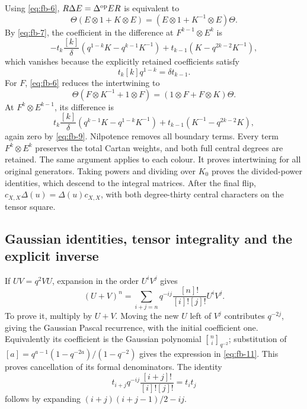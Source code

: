 Using \eqref{eq:fb-6}, \(R\Delta E=\Delta^{\rm op}E R\) is equivalent to
\begin{equation}\tag{FB8}\label{eq:fb-8}
\Theta(E\otimes1+K\otimes E)
 =(E\otimes1+K^{-1}\otimes E)\Theta.
\end{equation}
By \eqref{eq:fb-7}, the coefficient in the difference at \(F^{k-1}\otimes E^k\) is
\[
 -t_k\frac{[k]}{\delta}(q^{1-k}K-q^{k-1}K^{-1})
 +t_{k-1}(K-q^{2k-2}K^{-1}),
\]
which vanishes because the explicitly retained coefficients satisfy
\begin{equation}\tag{FB9}\label{eq:fb-9}
t_k[k]q^{1-k}=\delta t_{k-1}.
\end{equation}
For \(F\), \eqref{eq:fb-6} reduces the intertwining to
\begin{equation}\tag{FB10}\label{eq:fb-10}
\Theta(F\otimes K^{-1}+1\otimes F)
 =(1\otimes F+F\otimes K)\Theta.
\end{equation}
At \(F^k\otimes E^{k-1}\), its difference is
\[
 t_k\frac{[k]}{\delta}(q^{k-1}K-q^{1-k}K^{-1})
 +t_{k-1}(K^{-1}-q^{2k-2}K),
\]
again zero by \eqref{eq:fb-9}. Nilpotence removes all boundary terms. Every term
\(F^k\otimes E^k\) preserves the total Cartan weights, and both full
central degrees are retained. The same argument applies to each colour.
It proves intertwining for all original generators. Taking powers and
dividing over \(K_0\) proves the divided-power identities, which descend
to the integral matrices. After the final flip,
\(c_{X,X}\Delta(u)=\Delta(u)c_{X,X}\), with both degree-thirty central
characters on the tensor square.

\subsection{Gaussian identities, tensor integrality and the explicit inverse}
\label{sec:fb-gaussian}

If \(UV=q^2VU\), expansion in the order \(U^iV^j\) gives
\begin{equation}\tag{FB11}\label{eq:fb-11}
(U+V)^n=\sum_{i+j=n}
 q^{-ij}\frac{[n]!}{[i]![j]!}U^iV^j.
\end{equation}
To prove it, multiply by \(U+V\). Moving the new \(U\) left of \(V^j\)
contributes \(q^{-2j}\), giving the Gaussian Pascal recurrence, with
the initial coefficient one. Equivalently its coefficient is the
Gaussian polynomial \({n\brack i}_{q^{-2}}\); substitution of
\([a]=q^{a-1}(1-q^{-2a})/(1-q^{-2})\) gives the expression in \eqref{eq:fb-11}.
This proves cancellation of its formal denominators. The identity
\begin{equation}\tag{FB12}\label{eq:fb-12}
t_{i+j}q^{-ij}\frac{[i+j]!}{[i]![j]!}=t_it_j
\end{equation}
follows by expanding \((i+j)(i+j-1)/2-ij\).

